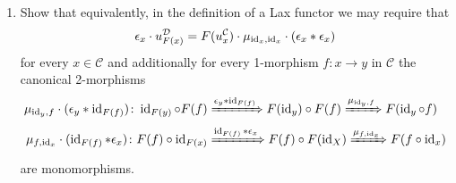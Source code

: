 \begin{Exercise}
	\begin{enumerate}[resume, label=(\alph*)]
		\item 
		Show that equivalently, in the definition of a Lax functor we may require that 
		\[
		\epsilon_x \cdot u_{ F ( x ) }^{ \mathcal{ D } } = F ( u_x^{ \mathcal{ C } } ) \cdot \mu_{ \operatorname{id}_x , \operatorname{id}_x } \cdot ( \epsilon_x * \epsilon_x )
		\]
		for every $ x \in \mathcal{ C } $ and additionally for every 1-morphism
		$ f \colon x \to y $ in $ \mathcal{ C } $ the canonical 2-morphisms
		\begin{align*}
			\mu_{ \operatorname{id}_y , f } \cdot ( \epsilon_y * \operatorname{id}_{ F ( f ) } ) \colon \operatorname{id}_{ F ( y ) } \circ F ( f ) 
			& \xRightarrow{ \epsilon_y * \operatorname{id}_{ F ( f ) } } 
			F ( \operatorname{id}_y ) \circ F ( f ) 
			\xRightarrow{ \mu_{ \operatorname{id}_y , f } }
			F ( \operatorname{id}_y \circ f )
			\\
			\mu_{ f , \operatorname{id}_x } \cdot ( \operatorname{id}_{ F ( f ) } * \epsilon_x ) \colon  F ( f ) \circ \operatorname{id}_ { F ( x ) } 
			& \xRightarrow{ \operatorname{id}_{ F ( f ) } * \epsilon_x }
			F ( f ) \circ F ( \operatorname{id}_X ) 
			\xRightarrow{ \mu_{ f , \operatorname{id}_x } }
			F ( f \circ \operatorname{id}_x )
		\end{align*}
		are monomorphisms.
	\end{enumerate}
\end{Exercise}

